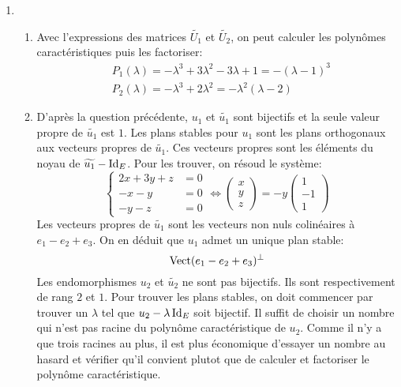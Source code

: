 \begin{enumerate}
 \item 
\begin{enumerate}
 \item Avec l'expressions des matrices $\widetilde{U_1}$ et $\widetilde{U_2}$, on peut calculer les polynômes caractéristiques puis les factoriser:
\begin{align*}
 &P_1(\lambda) = -\lambda^{3}+3\lambda^{2}-3\lambda + 1 = -(\lambda -1)^3
\\
 &P_2(\lambda) = -\lambda^{3}+2\lambda^{2}= -\lambda^2(\lambda-2)
\end{align*}
 \item D'après la question précédente, $u_1$ et $\widetilde{u_1}$ sont bijectifs et la seule valeur propre de $\widetilde{u_1}$ est $1$. Les plans stables pour $u_1$ sont les plans orthogonaux aux vecteurs propres de $\widetilde{u_1}$. Ces vecteurs propres sont les éléments du noyau de $\widetilde{u_1}-\operatorname{Id}_E$. Pour les trouver, on résoud le système:
\begin{displaymath}
 \left\lbrace 
\begin{aligned}
 2x+3y+z &= 0 \\ -x-y &=0 \\ -y -z &= 0
\end{aligned}
\right. \Leftrightarrow
\begin{pmatrix}
 x \\ y \\ z
\end{pmatrix}
= -y
\begin{pmatrix}
 1 \\ -1 \\ 1
\end{pmatrix}
\end{displaymath}
 Les vecteurs propres de $\widetilde{u_1}$ sont les vecteurs non nuls colinéaires à $e_1-e_2+e_3$. On en déduit que $u_1$ admet un unique plan stable:
\begin{displaymath}
 \operatorname{Vect}(e_1-e_2+e_3)^{\perp}
\end{displaymath}
Les endomorphismes $u_2$ et $\widetilde{u_2}$ ne sont pas bijectifs. Ils sont respectivement de rang $2$ et $1$. Pour trouver les plans stables, on doit commencer par trouver un $\lambda$ tel que $u_2-\lambda \operatorname{Id}_E$ soit bijectif. Il suffit de choisir un nombre qui n'est pas racine du polynôme caractéristique de $u_2$.\newline
Comme il n'y a que trois racines au plus, il est plus économique d'essayer un nombre au hasard et vérifier qu'il convient plutot que de calculer et factoriser le polynôme caractéristique.\newline

\end{enumerate}
\end{enumerate}
